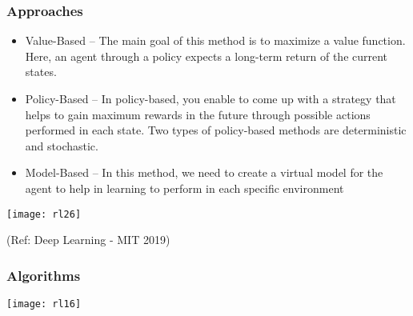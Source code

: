 \begin{frame}[fragile]\frametitle{Approaches}

\begin{itemize}
\item Value-Based – The main goal of this method is to maximize a value function. Here, an agent through a policy expects a long-term return of the current states.

\item Policy-Based – In policy-based, you enable to come up with a strategy that helps to gain maximum rewards in the future through possible actions performed in each state. Two types of policy-based methods are deterministic and stochastic.

\item Model-Based – In this method, we need to create a virtual model for the agent to help in learning to perform in each specific environment
\end{itemize}

\begin{center}
\texttt{[image: rl26]}
\end{center}

{\tiny (Ref: Deep Learning - MIT 2019)}

\end{frame}

\begin{frame}[fragile]\frametitle{Algorithms}

\begin{center}
\texttt{[image: rl16]}
\end{center}

\end{frame}





